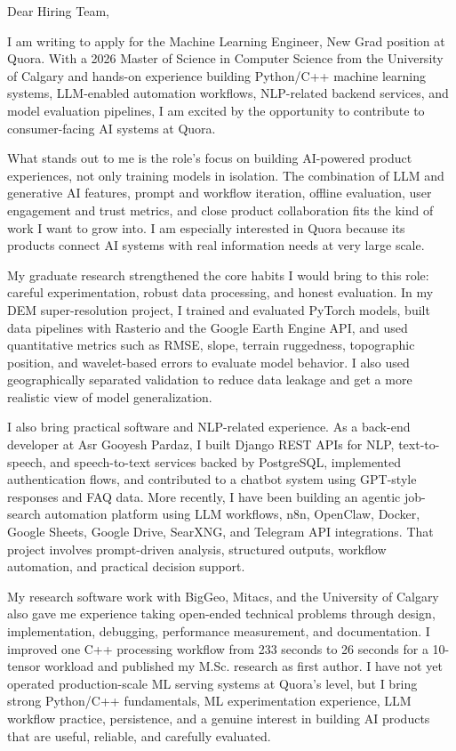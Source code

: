 \documentclass[11pt]{letter}
\begin{document}
\begin{letter}{}

\opening{Dear Hiring Team,}

I am writing to apply for the Machine Learning Engineer, New Grad position at Quora. With a 2026 Master of Science in Computer Science from the University of Calgary and hands-on experience building Python/C++ machine learning systems, LLM-enabled automation workflows, NLP-related backend services, and model evaluation pipelines, I am excited by the opportunity to contribute to consumer-facing AI systems at Quora.

What stands out to me is the role's focus on building AI-powered product experiences, not only training models in isolation. The combination of LLM and generative AI features, prompt and workflow iteration, offline evaluation, user engagement and trust metrics, and close product collaboration fits the kind of work I want to grow into. I am especially interested in Quora because its products connect AI systems with real information needs at very large scale.

My graduate research strengthened the core habits I would bring to this role: careful experimentation, robust data processing, and honest evaluation. In my DEM super-resolution project, I trained and evaluated PyTorch models, built data pipelines with Rasterio and the Google Earth Engine API, and used quantitative metrics such as RMSE, slope, terrain ruggedness, topographic position, and wavelet-based errors to evaluate model behavior. I also used geographically separated validation to reduce data leakage and get a more realistic view of model generalization.

I also bring practical software and NLP-related experience. As a back-end developer at Asr Gooyesh Pardaz, I built Django REST APIs for NLP, text-to-speech, and speech-to-text services backed by PostgreSQL, implemented authentication flows, and contributed to a chatbot system using GPT-style responses and FAQ data. More recently, I have been building an agentic job-search automation platform using LLM workflows, n8n, OpenClaw, Docker, Google Sheets, Google Drive, SearXNG, and Telegram API integrations. That project involves prompt-driven analysis, structured outputs, workflow automation, and practical decision support.

My research software work with BigGeo, Mitacs, and the University of Calgary also gave me experience taking open-ended technical problems through design, implementation, debugging, performance measurement, and documentation. I improved one C++ processing workflow from 233 seconds to 26 seconds for a 10-tensor workload and published my M.Sc. research as first author. I have not yet operated production-scale ML serving systems at Quora's level, but I bring strong Python/C++ fundamentals, ML experimentation experience, LLM workflow practice, persistence, and a genuine interest in building AI products that are useful, reliable, and carefully evaluated.


\end{letter}
\end{document}
